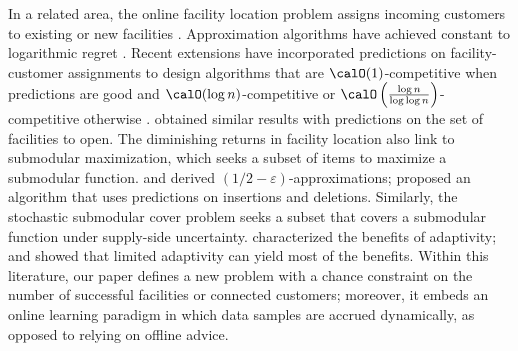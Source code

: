 \documentclass[blindrev]{informs3noheader}
\begin{document}
In a related area, the online facility location problem assigns incoming customers to existing or new facilities \citep{fotakis2011online}. Approximation algorithms have achieved constant to logarithmic regret \citep[e.g.,][]{meyerson2001online,fotakis2008competitive,guo2020facility}. Recent extensions have incorporated predictions on facility-customer assignments to design algorithms that are $\calO(1)$-competitive when predictions are good and $\calO(\log n)$-competitive or $\calO\left(\frac{\log n}{\log\log n}\right)$-competitive otherwise \citep{jiang2021online,fotakis2021learning}. \cite{almanza2021online} obtained similar results with predictions on the set of facilities to open. The diminishing returns in facility location also link to submodular maximization, which seeks a subset of items to maximize a submodular function. \cite{lattanzi2020fully} and \cite{monemizadeh2020dynamic} derived $(1/2-\varepsilon)$-approximations; \cite{agarwal2023learning} proposed an algorithm that uses predictions on insertions and deletions. Similarly, the stochastic submodular cover problem seeks a subset that covers a submodular function under supply-side uncertainty. \cite{goemans2006stochastic} characterized the benefits of adaptivity; \cite{agarwal2019stochastic} and \cite{ghuge2022power} showed that limited adaptivity can yield most of the benefits. Within this literature, our paper defines a new problem with a chance constraint on the number of successful facilities or connected customers; moreover, it embeds an online learning paradigm in which data samples are accrued dynamically, as opposed to relying on offline advice.
\end{document}
